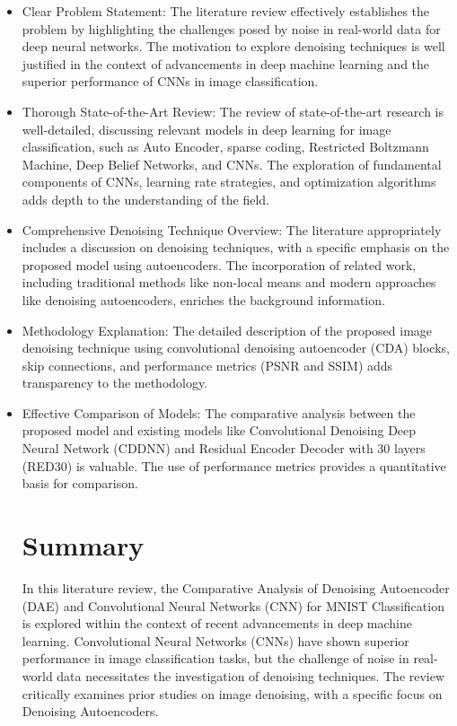\begin{itemize}
    \item Clear Problem Statement: The literature review effectively establishes the problem by highlighting the challenges posed by noise in real-world data for deep neural networks. The motivation to explore denoising techniques is well justified in the context of advancements in deep machine learning and the superior performance of CNNs in image classification.

    \item Thorough State-of-the-Art Review: The review of state-of-the-art research is well-detailed, discussing relevant models in deep learning for image classification, such as Auto Encoder, sparse coding, Restricted Boltzmann Machine, Deep Belief Networks, and CNNs. The exploration of fundamental components of CNNs, learning rate strategies, and optimization algorithms adds depth to the understanding of the field.

    \item Comprehensive Denoising Technique Overview: The literature appropriately includes a discussion on denoising techniques, with a specific emphasis on the proposed model using autoencoders. The incorporation of related work, including traditional methods like non-local means and modern approaches like denoising autoencoders, enriches the background information.

    \item Methodology Explanation: The detailed description of the proposed image denoising technique using convolutional denoising autoencoder (CDA) blocks, skip connections, and performance metrics (PSNR and SSIM) adds transparency to the methodology.

    \item Effective Comparison of Models: The comparative analysis between the proposed model and existing models like Convolutional Denoising Deep Neural Network (CDDNN) and Residual Encoder Decoder with 30 layers (RED30) is valuable. The use of performance metrics provides a quantitative basis for comparison.

\section{Summary} 

In this literature review, the Comparative Analysis of Denoising Autoencoder (DAE) and Convolutional Neural Networks (CNN) for MNIST Classification is explored within the context of recent advancements in deep machine learning. Convolutional Neural Networks (CNNs) have shown superior performance in image classification tasks, but the challenge of noise in real-world data necessitates the investigation of denoising techniques. The review critically examines prior studies on image denoising, with a specific focus on Denoising Autoencoders.


\end{itemize}
